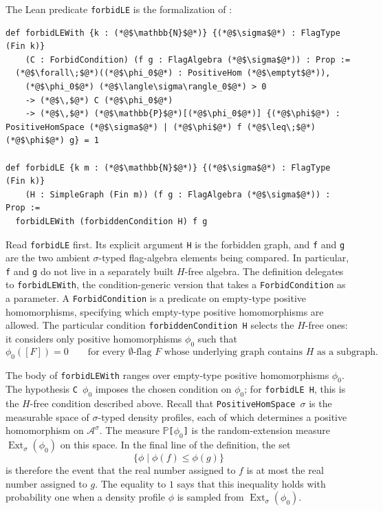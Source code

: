 \documentclass{article}
\newcommand{\lean}[1]{\texttt{#1}}
\newcommand{\emptyt}{\emptyset_{\mathrm{t}}}
\newcommand{\Ext}{\operatorname{Ext}}
\begin{document}
The Lean predicate \lean{forbidLE} is the formalization of
:
\begin{lstlisting}
def forbidLEWith {k : (*@$\mathbb{N}$@*)} {(*@$\sigma$@*) : FlagType (Fin k)}
    (C : ForbidCondition) (f g : FlagAlgebra (*@$\sigma$@*)) : Prop :=
  (*@$\forall\;$@*)((*@$\phi_0$@*) : PositiveHom (*@$\emptyt$@*)),
    (*@$\phi_0$@*) (*@$\langle\sigma\rangle_0$@*) > 0
    -> (*@$\,$@*) C (*@$\phi_0$@*)
    -> (*@$\,$@*) (*@$\mathbb{P}$@*)[(*@$\phi_0$@*)] {(*@$\phi$@*) : PositiveHomSpace (*@$\sigma$@*) | (*@$\phi$@*) f (*@$\leq\;$@*)(*@$\phi$@*) g} = 1

def forbidLE {k m : (*@$\mathbb{N}$@*)} {(*@$\sigma$@*) : FlagType (Fin k)}
    (H : SimpleGraph (Fin m)) (f g : FlagAlgebra (*@$\sigma$@*)) : Prop :=
  forbidLEWith (forbiddenCondition H) f g
\end{lstlisting}
Read \lean{forbidLE} first.  Its explicit argument
\lean{H} is the forbidden graph, and \lean{f} and \lean{g} are the two
ambient \(\sigma\)-typed flag-algebra elements being compared.  In particular,
\lean{f} and \lean{g} do not live in a separately built \(H\)-free algebra.
The definition delegates to \lean{forbidLEWith}, the condition-generic version
that takes a \lean{ForbidCondition} as a parameter.  A \lean{ForbidCondition}
is a predicate on empty-type positive homomorphisms,
specifying which empty-type positive homomorphisms are allowed.  The particular condition
\lean{forbiddenCondition H} selects the \(H\)-free ones: it considers only
positive homomorphisms \(\phi_0\) such that
\[
  \phi_0([F])=0
  \qquad
  \text{for every \(\emptyset\)-flag } F
  \text{ whose underlying graph contains } H \text{ as a subgraph}.
\]

The body of \lean{forbidLEWith} ranges over empty-type positive homomorphisms
\lean{$\phi_0$}.  The hypothesis \lean{C $\phi_0$} imposes the chosen condition
on \lean{$\phi_0$}; for \lean{forbidLE H}, this is the \(H\)-free condition
described above.  Recall that \lean{PositiveHomSpace $\sigma$} is the measurable
space of \(\sigma\)-typed density profiles, each of which determines a positive
homomorphism on \(\mathcal{A}^\sigma\).  The measure
\lean{$\mathbb{P}$[$\phi_0$]} is the random-extension measure
\(\Ext_\sigma(\phi_0)\) on this space.  In the final line of the definition, the
set
\[
  \{\phi\mid \phi(f)\leq\phi(g)\}
\]
is therefore the event that the real number assigned to \(f\) is at most the
real number assigned to \(g\).  The equality to \(1\) says that this inequality
holds with probability one when a density profile \(\phi\) is sampled from
\(\Ext_\sigma(\phi_0)\).
\end{document}
